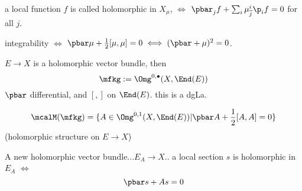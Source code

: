 a local function $f$ is called holomorphic in $X_\mu$, 
$\iff$ $\pbar_jf+\sum_i\mu^i_{\overline{j}}\p_if=0$ for all $j$.

integrability $\iff$ $\pbar\mu+\frac{1}{2}[\mu,\mu]=0\iff(\pbar+\mu)^2=0$.

\begin{example}
$E\to X$ is a holomorphic vector bundle, then 
$$\mfkg:=\Omg^{0,\bullet}(X,\End(E))$$
$\pbar$ differential, and $[,]$ on $\End(E)$.
this is a dgLa.

$$\mcalM(\mfkg)=\{A\in\Omg^{0,1}(X,\End(E))|\pbar A+\frac{1}{2}[A,A]=0\}$$
(holomorphic structure on $E\to X$)

A new holomorphic vector bundle...$E_A\to X$..
a local section $s$ is holomorphic in $E_A$
$\iff$
$$\pbar s+As=0$$
\end{example}










